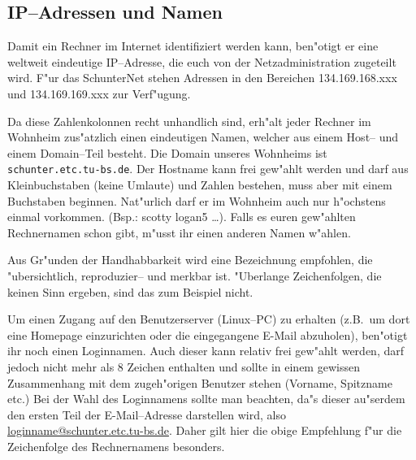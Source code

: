 
\subsection{IP--Adressen und Namen}
\label{ip}

Damit ein Rechner im Internet identifiziert werden kann, ben"otigt er
eine weltweit eindeutige IP--Adresse, die euch von der \glossar
Netzadministration zugeteilt wird. F"ur das SchunterNet stehen Adressen in den
Bereichen 134.169.168.xxx und 134.169.169.xxx zur Verf"ugung. 

Da diese Zahlenkolonnen recht unhandlich sind, erh"alt jeder Rechner im
Wohnheim zus"atzlich einen eindeutigen Namen, welcher aus einem Host-- und einem
Domain--Teil besteht. Die Domain unseres Wohnheims ist {\tt
  schunter.etc.tu-bs.de}. Der Hostname kann frei gew"ahlt werden und darf aus
Kleinbuchstaben (keine Umlaute) und Zahlen bestehen, muss aber mit einem
Buchstaben beginnen. Nat"urlich darf er im Wohnheim auch nur
h"ochstens einmal vorkommen. (Bsp.: scotty logan5 \dots).
Falls es euren gew"ahlten Rechnernamen schon gibt, m"usst ihr
einen anderen Namen w"ahlen.

Aus Gr"unden der Handhabbarkeit wird eine Bezeichnung empfohlen, die
"ubersichtlich, reproduzier-- und merkbar ist. "Uberlange Zeichenfolgen, die
keinen Sinn ergeben, sind das zum Beispiel nicht.

Um einen Zugang auf den Benutzerserver (Linux--PC) zu erhalten (z.B.\  um dort
eine \glossar Homepage einzurichten oder die eingegangene \glossar E-Mail
abzuholen), ben"otigt ihr noch einen Loginnamen. Auch dieser kann relativ frei
gew"ahlt werden, darf jedoch nicht mehr als 8 Zeichen enthalten und sollte in
einem gewissen Zusammenhang mit dem zugeh"origen Benutzer stehen (Vorname,
Spitzname etc.) Bei der Wahl des Loginnamens sollte man beachten, da"s dieser
au"serdem den ersten Teil der E-Mail--Adresse darstellen wird, also
\url{loginname@schunter.etc.tu-bs.de}. Daher gilt hier die obige Empfehlung
f"ur die Zeichenfolge des Rechnernamens besonders.

